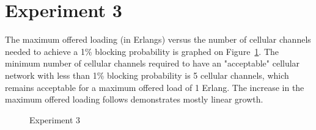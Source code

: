 \section*{Experiment 3}
The maximum offered loading (in Erlangs) versus the number of cellular channels needed to achieve a 1\% blocking probability is graphed on Figure~\ref{fig:exp3}. The minimum number of cellular channels required to have an "acceptable" cellular network with less than 1\% blocking probability is 5 cellular channels, which remains acceptable for a maximum offered load of 1 Erlang. The increase in the maximum offered loading follows demonstrates mostly linear growth.

\begin{figure}[htp]
\centering
{}
\caption{Experiment 3}
\label{fig:exp3}
\end{figure}